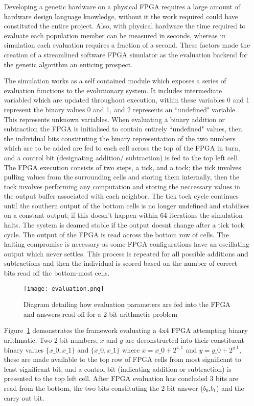 Developing a genetic hardware on a physical FPGA requires a large amount of hardware
design language knowledge, without it the work required could have constituted the
entire project. Also, with physical hardware the time required to evaluate each
population member can be measured in seconds, whereas in simulation each evaluation
requires a fraction of a second. These factors made the creation of a
streamlined software FPGA simulator as the evaluation backend for the
genetic algorithm an enticing prospect.

The simulation works as a self contained module which exposes a series of
evaluation functions to the evolutionary system.
It includes intermediate variabled which are updated throughout
execution, within these variables 0 and 1 represent the binary values
0 and 1, and 2 represents an ``undefined" variable. This represents
unknown variables.
When evaluating a binary
addition or subtraction the FPGA is initialised to contain entirely ``undefined"
values, then the individual bits constituting the binary representation of the two numbers
which are to be added are fed
to each cell across the top of the FPGA in turn, and a control bit (designating addition/
subtraction) is fed to the top left cell. The FPGA execution consists of
two steps, a tick, and a tock; the tick involves pulling values from the surrounding
cells and storing them internally, then the tock involves performing any computation
and storing the neccessary values in the output buffer associated with each neighbor.
The tick tock
cycle continues until the southern output of the bottom cells is no longer undefined
and stabilises on a constant output; if this doesn't happen within 64 iterations
the simulation halts. The system is deamed stable if the output doesnt change after
a tick tock cycle.
The output of the FPGA is read across the bottom row of cells.
The halting compromise is necessary as some FPGA configurations
have an oscillating output which never settles. This process is repeated for all possible
additions and subtractions and then the individual is scored based on the number
of correct bits read off the bottom-most cells.

\begin{figure}
\centering
\texttt{[image: evaluation.png]}
\caption{Diagram detailing how evaluation parameters are fed into the FPGA and answers
read off for a 2-bit arithmetic problem}
\label{fig:control}
\end{figure}

Figure~\ref{fig:control} demonstrates the framework evaluating a 4x4 FPGA attempting
binary arithmatic. Two 2-bit numbers, $x$ and $y$ are deconstructed into their constituent
binary values $\{x\_0,x\_1\}$ and $\{x\_0,x\_1\}$ where $x = x\_0 + 2^{x\_1}$ and $y = y\_0 + 2^{y\_1}$,
these are made available
to the top row of FPGA cells from most significant to least significant bit, and a
control bit (indicating addition or subtraction) is presented to the top left cell.
After FPGA evaluation has concluded 3 bits are read from the bottom, the two bits
constituting the 2-bit answer ($b_0$,$b_1$) and the carry out bit.

